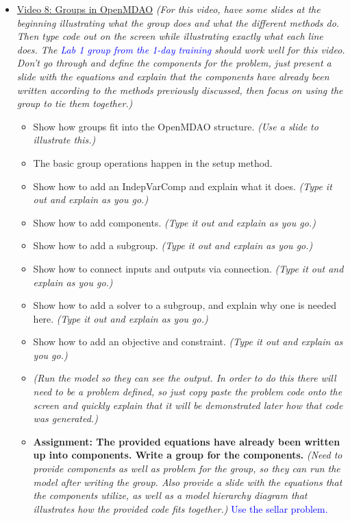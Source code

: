 \documentclass[12pt, letterpaper]{article}
\begin{document}
\begin{itemize}
	\item \underline{Video 8: Groups in OpenMDAO} \textit{(For this video, have some slides at the beginning illustrating what the group does and what the different methods do. Then type code out on the screen while illustrating exactly what each line does. The \textcolor{blue}{Lab 1 group from the 1-day training} should work well for this video. Don’t go through and define the components for the problem, just present a slide with the equations and explain that the components have already been written according to the methods previously discussed, then focus on using the group to tie them together.)}
		\begin{itemize}
			\item Show how groups fit into the OpenMDAO structure. \textit{(Use a slide to illustrate this.)}
			\item The basic group operations happen in the setup method.
			\item Show how to add an IndepVarComp and explain what it does. \textit{(Type it out and explain as you go.)}
			\item Show how to add components. \textit{(Type it out and explain as you go.)}
			\item Show how to add a subgroup. \textit{(Type it out and explain as you go.)}
			\item Show how to connect inputs and outputs via connection. \textit{(Type it out and explain as you go.)}
			\item Show how to add a solver to a subgroup, and explain why one is needed here. \textit{(Type it out and explain as you go.)}
			\item Show how to add an objective and constraint. \textit{(Type it out and explain as you go.)}
			\item \textit{(Run the model so they can see the output. In order to do this there will need to be a problem defined, so just copy paste the problem code onto the screen and quickly explain that it will be demonstrated later how that code was generated.)}
			\item \textbf{Assignment: The provided equations have already been written up into components. Write a group for the components.} \textit{(Need to provide components as well as problem for the group, so they can run the model after writing the group. Also provide a slide with the equations that the components utilize, as well as a model hierarchy diagram that illustrates how the provided code fits together.)} \textcolor{blue}{Use the sellar problem.}
		\end{itemize}
		

\end{itemize}
\end{document}
